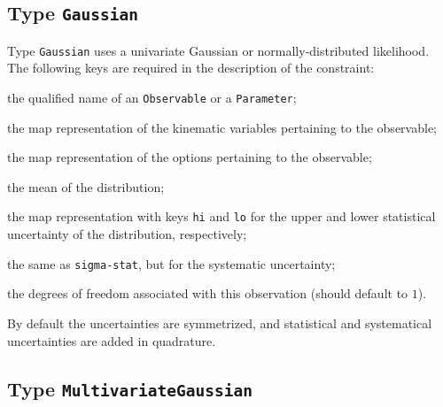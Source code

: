 \subsection{Type \texttt{Gaussian}}

Type \texttt{Gaussian} uses a univariate Gaussian or normally-distributed
likelihood. The following keys are required in the description of the
constraint:
\begin{description}[labelwidth=.15\textwidth]
    \item[\texttt{observable}] the qualified name of an \texttt{Observable} or a \texttt{Parameter};
    \item[\texttt{kinematics}] the map representation of the kinematic variables pertaining to the observable;
    \item[\texttt{options}] the map representation of the options pertaining to the observable;
    \item[\texttt{mean}] the mean of the distribution;
    \item[\texttt{sigma-stat}] the map representation with keys \texttt{hi} and \texttt{lo} for the
    upper and lower statistical uncertainty of the distribution, respectively;
    \item[\texttt{sigma-sys}] the same as \texttt{sigma-stat}, but for the systematic uncertainty;
    \item[\texttt{dof}] the degrees of freedom associated with this observation (should default to $1$).
\end{description}
By default the uncertainties are symmetrized, and statistical and systematical
uncertainties are added in quadrature.

\subsection{Type \texttt{MultivariateGaussian}}

